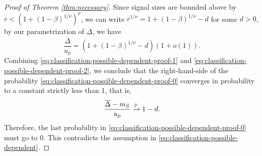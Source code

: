 \begin{proof} [Proof of Theorem \ref{thm:necessary}]
Since signal sizes are bounded above by $\overline{r} < \left(1 + (1-\beta)^{1/\nu}\right)^{\nu}$, we can write $\overline{r}^{1/\nu} = 1 + (1-\beta)^{1/\nu} - d$ for some $d > 0$, by our parametrization of $\overline{\Delta}$, we have
\begin{equation} \label{eq:classification-possible-dependent-proof-2}
    \frac{\overline{\Delta}}{u_p} = \left(1+(1-\beta)^{1/\nu}-d\right)(1+o(1)).
\end{equation}
Combining \eqref{eq:classification-possible-dependent-proof-1} and \eqref{eq:classification-possible-dependent-proof-2}, we conclude that the right-hand-side of the probability \eqref{eq:classification-possible-dependent-proof-0} converges in probability to a constant strictly less than 1, that is, 
\begin{equation}
    \frac{\overline{\Delta} - m_S}{u_p} \xrightarrow{\P} 1 - d.
\end{equation}
Therefore, the last probability in \eqref{eq:classification-possible-dependent-proof-0} must go to 0.
This contradicts the assumption in \eqref{eq:classification-possible-dependent}.
\end{proof}

